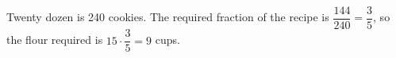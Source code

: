 Twenty dozen is 240 cookies. The required fraction of the recipe is $\dfrac{144}{240}=\dfrac{3}{5}$, so the flour required is $15\cdot\dfrac{3}{5}=\boxed{9}$ cups.
